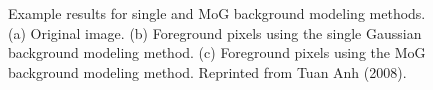 \begin{figure}[t]
  \centering
  \hspace{0.1in}
  \hspace{0.1in}
  \caption[Example results for single and MoG background modeling
    methods.]  {\small Example results for single and MoG background
    modeling methods. (a) Original image. (b) Foreground pixels using
    the single Gaussian background modeling method. (c) Foreground
    pixels using the MoG background modeling method. Reprinted from
    Tuan Anh (2008)\nocite{anh08thesis}.}
  \label{fig:bck-model-results}
\end{figure}

